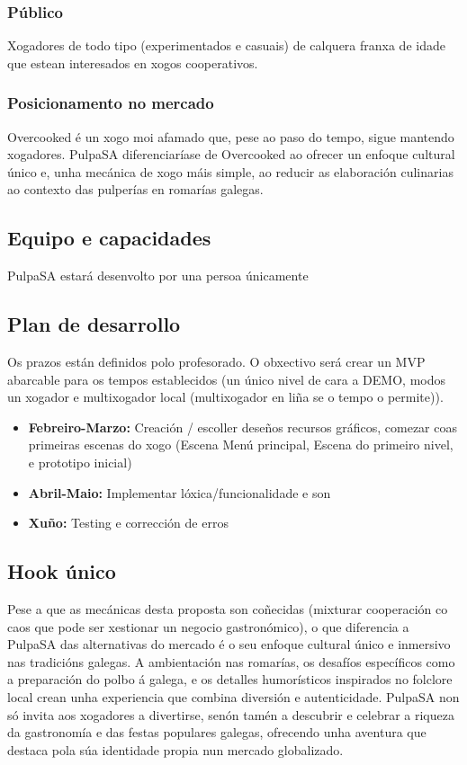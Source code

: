 \documentclass{report}  %
\begin{document}
\subsubsection{Público}
Xogadores de todo tipo (experimentados e casuais) de calquera franxa de 
idade que estean interesados en xogos cooperativos. 

\subsubsection{Posicionamento no mercado}
Overcooked é un xogo moi afamado que, pese ao paso do tempo, sigue 
mantendo xogadores. PulpaSA diferenciaríase de Overcooked ao ofrecer un 
enfoque cultural único e, unha mecánica de xogo máis simple, ao reducir as 
elaboración culinarias ao contexto das pulperías en romarías galegas. 

\subsection{Equipo e capacidades}

PulpaSA estará desenvolto por una persoa únicamente

\subsection{Plan de desarrollo}

Os prazos están definidos polo profesorado. O obxectivo será crear un MVP 
abarcable para os tempos establecidos (un único nivel de cara a DEMO, modos 
un xogador e multixogador local (multixogador en liña se o tempo o permite)). 
\begin{itemize}
    \item \textbf{Febreiro-Marzo:} Creación / escoller deseños recursos gráficos, comezar coas 
primeiras escenas do xogo (Escena Menú principal, Escena do primeiro nivel, e 
prototipo inicial) 
\item \textbf{Abril-Maio:} Implementar lóxica/funcionalidade e son 
\item \textbf{Xuño:} Testing e corrección de erros 
\end{itemize}

\subsection{Hook único}
Pese a que as mecánicas desta proposta son coñecidas (mixturar cooperación 
co caos que pode ser xestionar un negocio gastronómico), o que diferencia a 
PulpaSA das alternativas do mercado é o seu enfoque cultural único e 
inmersivo nas tradicións galegas. A ambientación nas romarías, os desafíos 
específicos como a preparación do polbo á galega, e os detalles humorísticos 
inspirados no folclore local crean unha experiencia que combina diversión e 
autenticidade. PulpaSA non só invita aos xogadores a divertirse, senón tamén a 
descubrir e celebrar a riqueza da gastronomía e das festas populares galegas, 
ofrecendo unha aventura que destaca pola súa identidade propia nun mercado 
globalizado.
\end{document}
